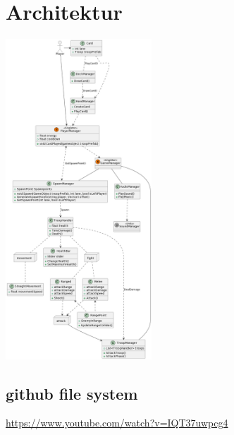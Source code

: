 \chapter{Architektur}
\includegraphics[height=12cm]{resources/bla.png}


\section*{github file system}
\url{https://www.youtube.com/watch?v=IQT37uwpcg4}